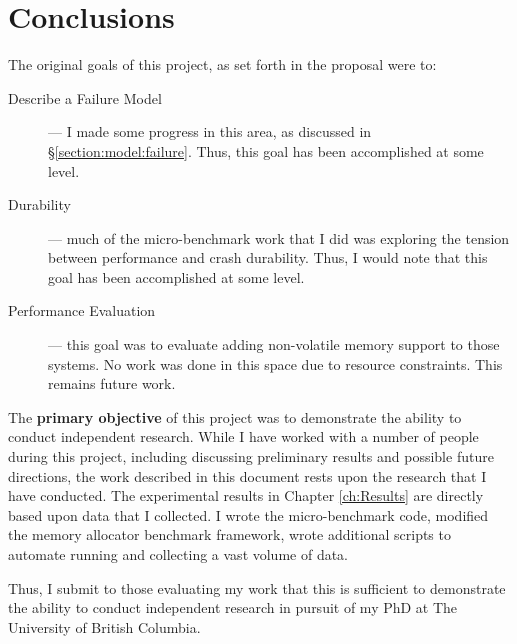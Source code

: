 
\chapter{Conclusions}
\label{ch:Conclusion}

The original goals of this project, as set forth in the proposal were to:

\begin{description}
    \item[Describe a Failure Model] --- I made some progress in this area, as discussed in \S \ref{section:model:failure}.  Thus, this goal has been accomplished at some level.
    \item[Durability] --- much of the micro-benchmark work that I did was exploring the tension between performance and crash durability.  Thus, I would note that this goal has been accomplished at some level.
    \item[Performance Evaluation] --- this goal was to evaluate adding non-volatile memory support to those systems.  No work was done in this space due to resource constraints.  This remains future work.
\end{description}

The \textbf{primary objective} of this project was to demonstrate the ability to conduct 
independent research.  While I have worked with a number of people during this project, including 
discussing preliminary results and possible future directions, the work described in this document 
rests upon the research that I have conducted.  The experimental results in Chapter \ref{ch:Results}
are directly based upon data that I collected.  I wrote the micro-benchmark code, modified the memory allocator benchmark framework, wrote additional scripts to automate running and collecting a vast volume of data.

Thus, I submit to those evaluating my work that this is sufficient to demonstrate the ability to conduct independent research in pursuit of my PhD at The University of British Columbia.
 